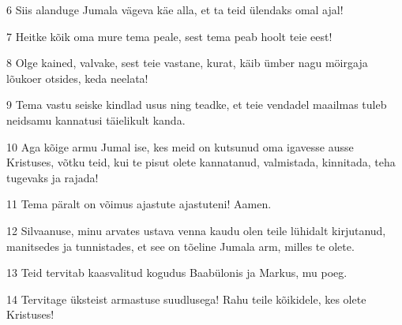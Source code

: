\par 6 Siis alanduge Jumala vägeva käe alla, et ta teid ülendaks omal ajal!
\par 7 Heitke kõik oma mure tema peale, sest tema peab hoolt teie eest!
\par 8 Olge kained, valvake, sest teie vastane, kurat, käib ümber nagu möirgaja lõukoer otsides, keda neelata!
\par 9 Tema vastu seiske kindlad usus ning teadke, et teie vendadel maailmas tuleb neidsamu kannatusi täielikult kanda.
\par 10 Aga kõige armu Jumal ise, kes meid on kutsunud oma igavesse ausse Kristuses, võtku teid, kui te pisut olete kannatanud, valmistada, kinnitada, teha tugevaks ja rajada!
\par 11 Tema päralt on võimus ajastute ajastuteni! Aamen.
\par 12 Silvaanuse, minu arvates ustava venna kaudu olen teile lühidalt kirjutanud, manitsedes ja tunnistades, et see on tõeline Jumala arm, milles te olete.
\par 13 Teid tervitab kaasvalitud kogudus Baabülonis ja Markus, mu poeg.
\par 14 Tervitage üksteist armastuse suudlusega! Rahu teile kõikidele, kes olete Kristuses!




